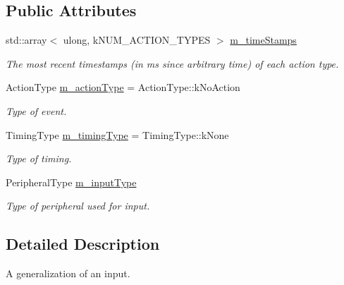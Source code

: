 \subsection*{Public Attributes}
\begin{DoxyCompactItemize}
\item 
std\+::array$<$ ulong, k\+N\+U\+M\+\_\+\+A\+C\+T\+I\+O\+N\+\_\+\+T\+Y\+P\+ES $>$ \mbox{\hyperlink{structrev_1_1_user_input_ab4af0c36ad391ebe88f4a61a9768e636}{m\+\_\+time\+Stamps}}
\begin{DoxyCompactList}\small\item\em The most recent timestamps (in ms since arbitrary time) of each action type. \end{DoxyCompactList}\item 
\mbox{\label{structrev_1_1_user_input_a49c30d308cc111d2bcaf47846f99ee31}} 
Action\+Type \mbox{\hyperlink{structrev_1_1_user_input_a49c30d308cc111d2bcaf47846f99ee31}{m\+\_\+action\+Type}} = Action\+Type\+::k\+No\+Action
\begin{DoxyCompactList}\small\item\em Type of event. \end{DoxyCompactList}\item 
\mbox{\label{structrev_1_1_user_input_a8892d76994b128600062a0d6f1b59a44}} 
Timing\+Type \mbox{\hyperlink{structrev_1_1_user_input_a8892d76994b128600062a0d6f1b59a44}{m\+\_\+timing\+Type}} = Timing\+Type\+::k\+None
\begin{DoxyCompactList}\small\item\em Type of timing. \end{DoxyCompactList}\item 
\mbox{\label{structrev_1_1_user_input_aebfc6fa7493caba1a58dcdae72300868}} 
Peripheral\+Type \mbox{\hyperlink{structrev_1_1_user_input_aebfc6fa7493caba1a58dcdae72300868}{m\+\_\+input\+Type}}
\begin{DoxyCompactList}\small\item\em Type of peripheral used for input. \end{DoxyCompactList}\end{DoxyCompactItemize}


\subsection{Detailed Description}
A generalization of an input. 

